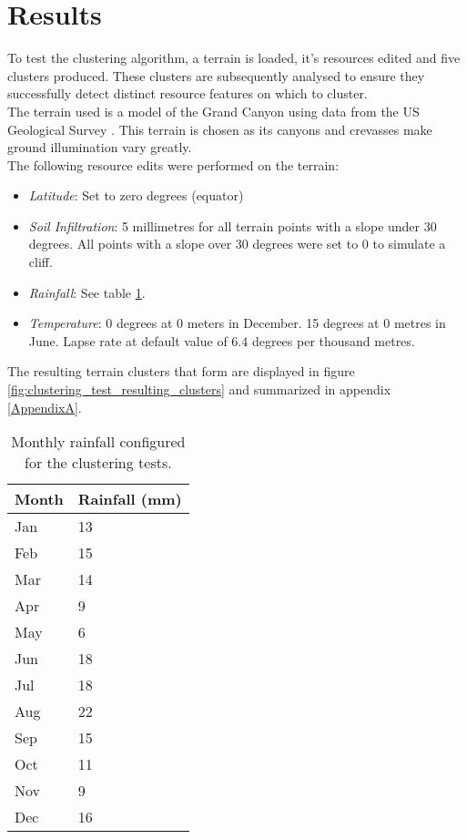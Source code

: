 \section{Results}

To test the clustering algorithm, a terrain is loaded, it's resources edited and five clusters produced. These clusters are subsequently analysed to ensure they successfully detect distinct resource features on which to cluster.\\

The terrain used is a model of the Grand Canyon using data from the US Geological Survey \protect\footnotemark {}. This terrain is chosen as its canyons and crevasses make ground illumination vary greatly.\\

The following resource edits were performed on the terrain:

\begin{itemize}
\item \textit{Latitude}: Set to zero degrees (equator)
\item \textit{Soil Infiltration}: 5 millimetres for all terrain points with a slope under 30 degrees. All points with a slope over 30 degrees were set to 0 to simulate a cliff.
\item \textit{Rainfall}: See table \ref{tab:clustering_test_rainfall}.
\item \textit{Temperature}: 0 degrees at 0 meters in December. 15 degrees at 0 metres in June. Lapse rate at default value of 6.4 degrees per thousand metres.
\end{itemize}

The resulting terrain clusters that form are displayed in figure \ref{fig:clustering_test_resulting_clusters} and summarized in appendix \ref{AppendixA}.

\begin{table}[]
  \centering
	    \begin{tabular}{|p{5cm}|p{5cm}|}
	    \hline
	    \textbf{Month} & \textbf{Rainfall (mm)}\\
		\hline
	    Jan & 13 \\
	    \hline
	    Feb & 15 \\
	    \hline
	    Mar & 14 \\
	    \hline
	    Apr & 9 \\
	    \hline
	    May & 6 \\
	    \hline
	    Jun & 18 \\
	    \hline
	    Jul & 18 \\
	    \hline
	    Aug & 22 \\
	    \hline
	    Sep & 15 \\
	    \hline
	    Oct & 11 \\
	    \hline
	    Nov & 9 \\
	    \hline
	    Dec & 16 \\
	    \hline
		\end{tabular}
		\caption{Monthly rainfall configured for the clustering tests.}
	  \label{tab:clustering_test_rainfall}
\end{table}

